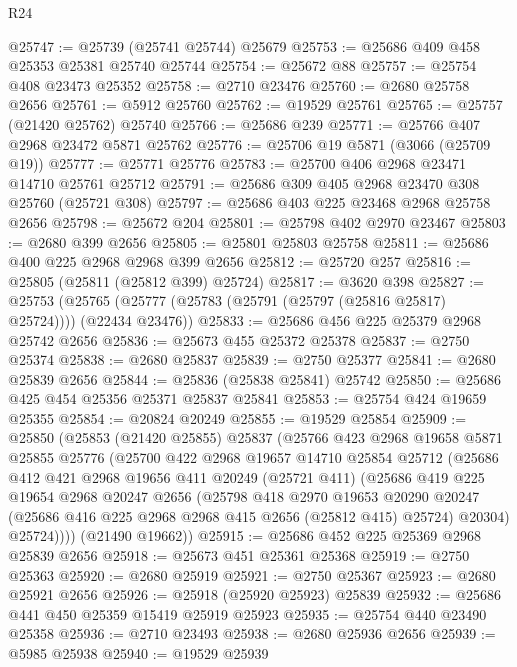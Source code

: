 \begin{lexlean}{R24}
\begin{coremodule}
@25747 := @25739 (@25741 @25744) @25679
@25753 := @25686 @409 @458 @25353 @25381 @25740 @25744
@25754 := @25672 @88
@25757 := @25754 @408 @23473 @25352
@25758 := @2710 @23476
@25760 := @2680 @25758 @2656
@25761 := @5912 @25760
@25762 := @19529 @25761
@25765 := @25757 (@21420 @25762) @25740
@25766 := @25686 @239
@25771 := @25766 @407 @2968 @23472 @5871 @25762
@25776 := @25706 @19 @5871 (@3066 (@25709 @19))
@25777 := @25771 @25776
@25783 := @25700 @406 @2968 @23471 @14710 @25761 @25712
@25791 := @25686 @309 @405 @2968 @23470 @308 @25760 (@25721 @308)
@25797 := @25686 @403 @225 @23468 @2968 @25758 @2656
@25798 := @25672 @204
@25801 := @25798 @402 @2970 @23467
@25803 := @2680 @399 @2656
@25805 := @25801 @25803 @25758
@25811 := @25686 @400 @225 @2968 @2968 @399 @2656
@25812 := @25720 @257
@25816 := @25805 (@25811 (@25812 @399) @25724)
@25817 := @3620 @398
@25827 := @25753 (@25765 (@25777 (@25783 (@25791 (@25797 (@25816 @25817) @25724)))) (@22434 @23476))
@25833 := @25686 @456 @225 @25379 @2968 @25742 @2656
@25836 := @25673 @455 @25372 @25378
@25837 := @2750 @25374
@25838 := @2680 @25837
@25839 := @2750 @25377
@25841 := @2680 @25839 @2656
@25844 := @25836 (@25838 @25841) @25742
@25850 := @25686 @425 @454 @25356 @25371 @25837 @25841
@25853 := @25754 @424 @19659 @25355
@25854 := @20824 @20249
@25855 := @19529 @25854
@25909 := @25850
    (@25853
      (@21420 @25855)
      @25837
      (@25766
        @423
        @2968
        @19658
        @5871
        @25855
        @25776
        (@25700
          @422
          @2968
          @19657
          @14710
          @25854
          @25712
          (@25686
            @412
            @421
            @2968
            @19656
            @411
            @20249
            (@25721 @411)
            (@25686
              @419
              @225
              @19654
              @2968
              @20247
              @2656
              (@25798
                @418
                @2970
                @19653
                @20290
                @20247
                (@25686 @416 @225 @2968 @2968 @415 @2656 (@25812 @415) @25724)
                @20304)
              @25724))))
      (@21490 @19662))
@25915 := @25686 @452 @225 @25369 @2968 @25839 @2656
@25918 := @25673 @451 @25361 @25368
@25919 := @2750 @25363
@25920 := @2680 @25919
@25921 := @2750 @25367
@25923 := @2680 @25921 @2656
@25926 := @25918 (@25920 @25923) @25839
@25932 := @25686 @441 @450 @25359 @15419 @25919 @25923
@25935 := @25754 @440 @23490 @25358
@25936 := @2710 @23493
@25938 := @2680 @25936 @2656
@25939 := @5985 @25938
@25940 := @19529 @25939

\end{coremodule}
\end{lexlean}
